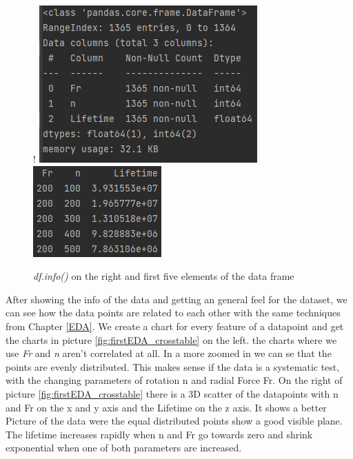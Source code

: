 \documentclass[a4paper, 12pt, oneside]{scrbook}
\begin{document}
			\begin{figure} [H]
				\centering
				\resizebox{\linewidth} {!} {
					\includegraphics{res/firstEDA/df_info.png}
					\includegraphics{res/firstEDA/df_head.png}
				}
				\caption{\textit{df.info()} on the right and first five elements of the data frame}
				\label{fig:firstEDA_Table}
			\end{figure}
			
			\noindent After showing the info of the data and getting an general feel for the dataset, we can see how the data points are related to each other with the same techniques from Chapter \ref{EDA}. We create a chart for every feature of a datapoint and get the charts in picture \ref{fig:firstEDA_crosstable} on the left. the charts where we use \textit{Fr} and \textit{n} aren't correlated at all. In a more zoomed in we can se that the points are evenly distributed. This makes sense if the data is a systematic test, with the changing parameters of rotation n and radial Force Fr. On the right of picture \ref{fig:firstEDA_crosstable} there is a 3D scatter of the datapoints with n and Fr on the x and y axis and the Lifetime on the z axis. It shows a better Picture of the data were the equal distributed points show a good visible plane. The lifetime increases rapidly when n and Fr go towards zero and shrink exponential when one of both parameters are increased.
	
\end{document}
